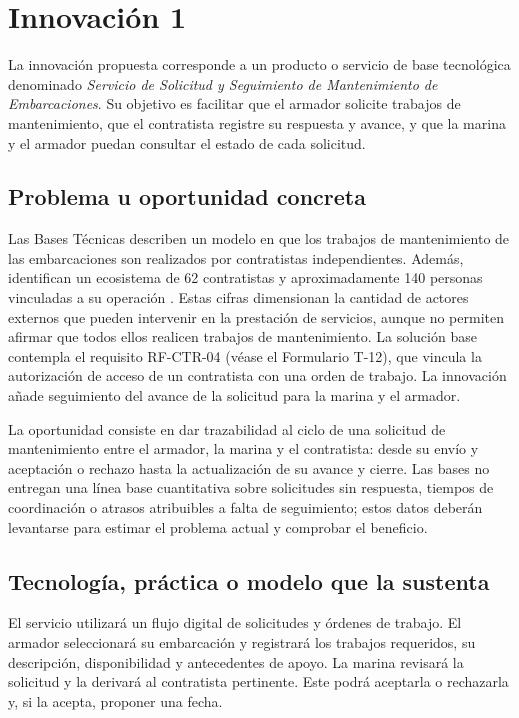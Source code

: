 \newpage

\section{Innovación 1}




La innovación propuesta corresponde a un producto o servicio de base tecnológica denominado \textit{Servicio de Solicitud y Seguimiento de Mantenimiento de Embarcaciones}. Su objetivo es facilitar que el armador solicite trabajos de mantenimiento, que el contratista registre su respuesta y avance, y que la marina y el armador puedan consultar el estado de cada solicitud.

\subsection{ Problema u oportunidad concreta}

Las Bases Técnicas describen un modelo en que los trabajos de mantenimiento de las embarcaciones son realizados por contratistas independientes. Además, identifican un ecosistema de 62 contratistas y aproximadamente 140 personas vinculadas a su operación \parencite{caso07}. Estas cifras dimensionan la cantidad de actores externos que pueden intervenir en la prestación de servicios, aunque no permiten afirmar que todos ellos realicen trabajos de mantenimiento. La solución base contempla el requisito RF-CTR-04 (véase el Formulario T-12), que vincula la autorización de acceso de un contratista con una orden de trabajo. La innovación añade seguimiento del avance de la solicitud para la marina y el armador.

La oportunidad consiste en dar trazabilidad al ciclo de una solicitud de mantenimiento entre el armador, la marina y el contratista: desde su envío y aceptación o rechazo hasta la actualización de su avance y cierre. Las bases no entregan una línea base cuantitativa sobre solicitudes sin respuesta, tiempos de coordinación o atrasos atribuibles a falta de seguimiento; estos datos deberán levantarse para estimar el problema actual y comprobar el beneficio.

\subsection{Tecnología, práctica o modelo que la sustenta}

El servicio utilizará un flujo digital de solicitudes y órdenes de trabajo. El armador seleccionará su embarcación y registrará los trabajos requeridos, su descripción, disponibilidad y antecedentes de apoyo. La marina revisará la solicitud y la derivará al contratista pertinente. Este podrá aceptarla o rechazarla y, si la acepta, proponer una fecha.


